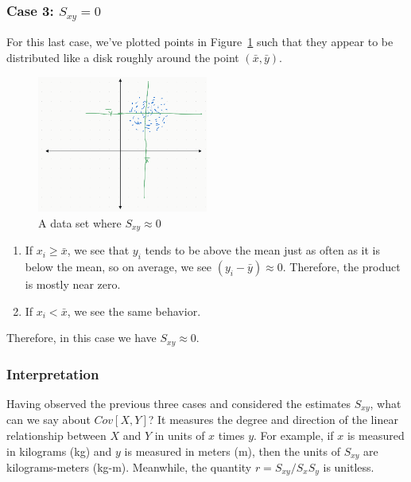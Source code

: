 \documentclass[12pt, a4paper]{article}
\theoremstyle{definition}
\begin{document}
	\subsubsection*{Case 3: $S_{xy} = 0$}
	For this last case, we've plotted points in Figure~\ref{fig:dataset-zero_{sxy}} such
	that they appear to be distributed like a disk roughly around the point $(\bar{x}, \bar{y})$.
	\begin{figure}
		\centering
		\includegraphics[width=0.5\textwidth]{zero-covariance-rvs}
		\caption{A data set where $S_{xy}\approx0$}
		\label{fig:dataset-zero_{sxy}}
	\end{figure}
	\begin{enumerate}[label=(\roman*)]
		\item If $x_i\geq \bar{x}$, we see that $y_i$ tends to be above the mean just
		as often as it is below the mean, so on average, we see $(y_i-\bar{y})\approx 0$.
		Therefore, the product is mostly near zero.
		\item If $x_i < \bar{x}$, we see the same behavior.
	\end{enumerate}
	Therefore, in this case we have $S_{xy}\approx 0$.
	\subsubsection*{Interpretation}
	Having observed the previous three cases and considered the estimates $S_{xy}$,
	what can we say about $Cov[X, Y]$? It measures the degree and direction of the
	linear relationship between $X$ and $Y$ in units of $x$ times $y$. For example,
	if $x$ is measured in kilograms (kg) and $y$ is measured in meters (m), then
	the units of $S_{xy}$ are kilograms-meters (kg-m).
	Meanwhile, the quantity $r=S_{xy}/S_xS_y$ is unitless.
\end{document}

